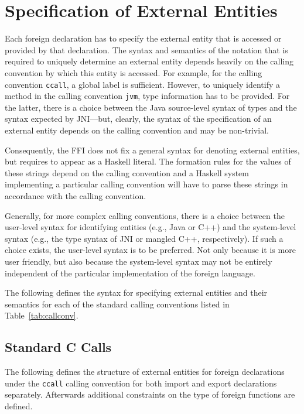 \documentclass[a4paper,twosides]{article}
\newcommand{\code}[1]{\texttt{#1}}      %
\begin{document}
\section{Specification of External Entities}
\label{sec:extent}

Each foreign declaration has to specify the external entity that is accessed
or provided by that declaration.  The syntax and semantics of the notation
that is required to uniquely determine an external entity depends heavily on
the calling convention by which this entity is accessed.  For example, for the
calling convention \code{ccall}, a global label is sufficient.  However, to
uniquely identify a method in the calling convention \code{jvm}, type
information has to be provided.  For the latter, there is a choice between the
Java source-level syntax of types and the syntax expected by JNI---but,
clearly, the syntax of the specification of an external entity depends on the
calling convention and may be non-trivial.

Consequently, the FFI does not fix a general syntax for denoting external
entities, but requires  to appear as a Haskell 
literal.  The formation rules for the values of these strings depend on the
calling convention and a Haskell system implementing a particular calling
convention will have to parse these strings in accordance with the calling
convention.

Generally, for more complex calling conventions, there is a choice between the
user-level syntax for identifying entities (e.g., Java or C{+}{+}) and the
system-level syntax (e.g., the type syntax of JNI or mangled C{+}{+},
respectively).  If such a choice exists, the user-level syntax is to be
preferred.  Not only because it is more user friendly, but also because the
system-level syntax may not be entirely independent of the particular
implementation of the foreign language.

The following defines the syntax for specifying external entities and their
semantics for each of the standard calling conventions listed in
Table~\ref{tab:callconv}.

\subsection{Standard C Calls}
\label{sec:ccall}

The following defines the structure of external entities for foreign
declarations under the \code{ccall} calling convention for both import and
export declarations separately.  Afterwards additional constraints on the type
of foreign functions are defined.
\end{document}
